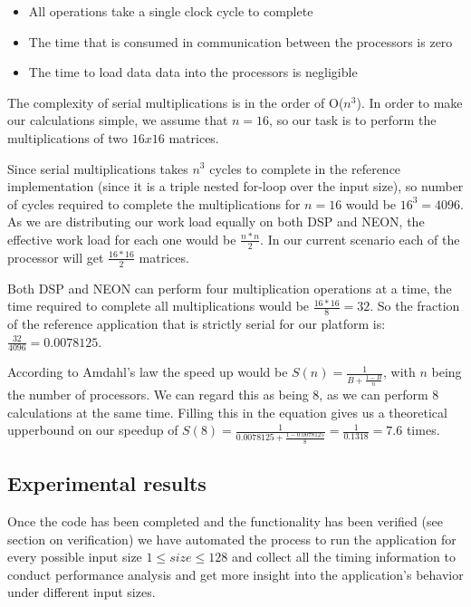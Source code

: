 \begin{itemize}
\item All operations take a single clock cycle to complete
\item The time that is consumed in communication between the processors is zero
\item The time to load data data into the processors is negligible
\end{itemize}

The complexity of serial multiplications is in the order of O($n^3$). In order to make our calculations simple, we assume that $n = 16$, so our task is to perform the multiplications of two $16x16$ matrices.

Since serial multiplications takes $n^3$ cycles to complete in the reference implementation (since it is a triple nested for-loop over the input size), so number of cycles required to complete the multiplications for $n = 16$ would be $16^3 = 4096$. As we are distributing our work load equally on both DSP and NEON, the effective work load for each one would be $\frac{n * n}{2}$. In our current scenario each of the processor will get $\frac{16 * 16}{2}$ matrices.

Both DSP and NEON can perform four multiplication operations at a time, the time required to complete all multiplications would be $\frac{16*16}{8} = 32$. So the fraction of the reference application that is strictly serial for our platform is: $\frac{32}{4096} = 0.0078125$.

According to Amdahl's law the speed up would be $S(n) = \frac{1}{B + \frac{1 - B}{n}}$, with $n$ being the number of processors. We can regard this as being 8, as we can perform 8 calculations at the same time. Filling this in the equation gives us a theoretical upperbound on our speedup of $S(8) = \frac{1}{{0.0078125 + \frac{1 - 0.0078125}{8}}} = \frac{1}{0.1318} = 7.6$ times.

\subsection{Experimental results}

Once the code has been completed and the functionality has been verified (see section on verification) we have automated the process to run the application for every possible input size $1 \leq size \leq 128$ and collect all the timing information to conduct performance analysis and get more insight into the application's behavior under different input sizes.

